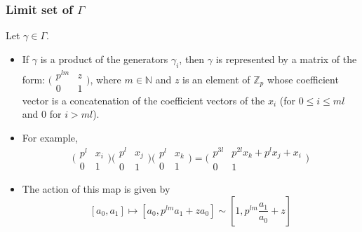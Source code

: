 \documentclass{beamer}
\theoremstyle{definition}
\begin{document}
\begin{frame}
\frametitle{Limit set of $\Gamma$}
 Let $\gamma \in \Gamma$.
\begin{itemize}
\item If $\gamma$ is a product of the generators $\gamma_i$, then $\gamma$ is represented by a matrix of the form:  $\bigl( \begin{smallmatrix}p^{lm} & z\\ 0 & 1 \end{smallmatrix}\bigr)$,  where $m \in \mathbb{N}$ and $z$ is an element of $\mathbb{Z}_p$ whose coefficient vector is a concatenation of the coefficient vectors of the $x_i$ (for $0 \leq i \leq ml$ and $0$ for $i > ml$).
\item  For example, 
\[\bigl( \begin{smallmatrix}p^{l} & x_i\\ 0 & 1 \end{smallmatrix}\bigr) \bigl( \begin{smallmatrix}p^{l} & x_j\\ 0 & 1 \end{smallmatrix}\bigr) \bigl( \begin{smallmatrix}p^{l} & x_k\\ 0 & 1 \end{smallmatrix}\bigr) = 
\bigl( \begin{smallmatrix}p^{3l} & p^{2l}x_k + p^lx_j +x_i\\ 0 & 1 \end{smallmatrix}\bigr)\]
\item The action of this map is given by \[[a_0,a_1] \mapsto [a_0, p^{lm}a_1 + za_0] \sim [1, p^{lm}\frac{a_1}{a_0} + z]\]
\end{itemize}
\end{frame}
\end{document}
